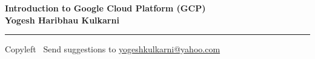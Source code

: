 
\graphicspath{{images/}}

\footnotesize


\begin{center}
\Large{\textbf{Introduction to Google Cloud Platform (GCP)\\ Yogesh Haribhau Kulkarni}}  
\end{center}

\begin{multicols}{2}

\end{multicols}

\rule{\linewidth}{0.25pt}
\scriptsize
Copyleft \textcopyleft\  Send suggestions to 
\href{http://www.yogeshkulkarni.com}{yogeshkulkarni@yahoo.com}



